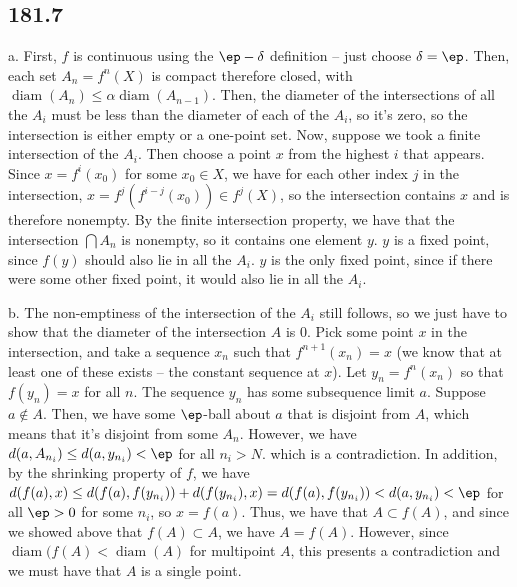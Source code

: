 \documentclass{article}
\DeclareMathOperator{\diam}{diam}
\begin{document}
\subsection*{181.7}
a. First, $f$ is continuous using the $\ep-\delta$ definition -- just choose $\delta=\ep$. Then, each set $A_n=f^n(X)$ is compact therefore closed, with $\diam(A_n)\leq\alpha\diam(A_{n-1})$. Then, the diameter of the intersections of all the $A_i$ must be less than the diameter of each of the $A_i$, so it's zero, so the intersection is either empty or a one-point set. Now, suppose we took a finite intersection of the $A_i$. Then choose a point $x$ from the highest $i$ that appears. Since $x=f^i(x_0)$ for some $x_0\in X$, we have for each other index $j$ in the intersection, $x=f^j(f^{i-j}(x_0))\in f^j(X)$, so the intersection contains $x$ and is therefore nonempty. By the finite intersection property, we have that the intersection $\bigcap A_n$ is nonempty, so it contains one element $y$. $y$ is a fixed point, since $f(y)$ should also lie in all the $A_i$. $y$ is the only fixed point, since if there were some other fixed point, it would also lie in all the $A_i$.

b. The non-emptiness of the intersection of the $A_i$ still follows, so we just have to show that the diameter of the intersection $A$ is $0$. Pick some point $x$ in the intersection, and take a sequence $x_n$ such that $f^{n+1}(x_n)=x$ (we know that at least one of these exists -- the constant sequence at $x$). Let $y_n=f^n(x_n)$ so that $f(y_n)=x$ for all $n$. The sequence $y_n$ has some subsequence limit $a$. Suppose $a\not\in A$. Then, we have some $\ep$-ball about $a$ that is disjoint from $A$, which means that it's disjoint from some $A_n$. However, we have $d(a,A_{n_i})\leq d(a,y_{n_i})<\ep$ for all $n_i>N$. which is a contradiction. In addition, by the shrinking property of $f$, we have $d(f(a),x)\leq d(f(a),f(y_{n_i}))+d(f(y_{n_i}),x)=d(f(a),f(y_{n_i}))<d(a,y_{n_i})<\ep$ for all $\ep>0$ for some $n_i$, so $x=f(a)$. Thus, we have that $A\subset f(A)$, and since we showed above that $f(A)\subset A$, we have $A=f(A)$. However, since $\diam(f(A)<\diam(A)$ for multipoint $A$, this presents a contradiction and we must have that $A$ is a single point.
 
\end{document}
